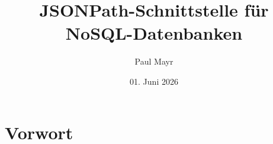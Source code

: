 \documentclass[oneside]{ausarbeitung}
\begin{document}

 \Masterarbeit


\IN

\title{JSONPath-Schnittstelle für NoSQL-Datenbanken}

\author{Paul Mayr}

\examinerIsAProfessortrue   %


\date{01. Juni 2026}



\maketitle
\cleardoublepage

\setcounter{page}{1}


\makeaffirmation
\cleardoublepage



\chapter*{Vorwort}
\end{document}
